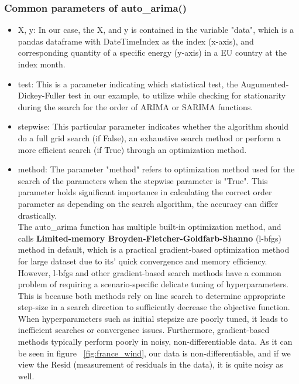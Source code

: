 \documentclass[]{usiinfbachelorproject}
\begin{document}
\subsubsection{Common parameters of auto\_arima()}
\begin{itemize}
\item X, y: In our case, the X, and y is contained in the variable "data", which is a pandas dataframe with DateTimeIndex as the index (x-axis), and corresponding quantity of a specific energy (y-axis) in a EU country at the index month. \\

\item test: This is a parameter indicating which statistical test, the Augumented-Dickey-Fuller test in our example, to utilize while checking for stationarity during the search for the order of ARIMA or SARIMA functions. \\

\item stepwise: This particular parameter indicates whether the algorithm should do a full grid search (if False), an exhaustive search method or perform a more efficient search (if True) through an optimization method. \\

\item method: The parameter "method" refers to optimization method used for the search of the parameters when the stepwise parameter is "True". This parameter holds significant importance in calculating the correct order parameter as depending on the search algorithm, the accuracy can differ drastically.\\

The auto\_arima function has multiple built-in optimization method, and calls \textbf{Limited-memory Broyden-Fletcher-Goldfarb-Shanno} (l-bfgs) method in default, which is a practical gradient-based optimization method for large dataset due to its' quick convergence and memory efficiency. However, l-bfgs and other gradient-based search methods have a common problem of requiring a scenario-specific delicate tuning of hyperparameters. This is because both methods rely on line search to determine appropriate step-size in a search direction to sufficiently decrease the objective function. When hyperparameters such as initial stepsize are poorly tuned, it leads to inefficient searches or convergence issues. Furthermore, gradient-based methods typically perform poorly in noisy, non-differentiable data. As it can be seen in figure ~\ref{fig:france_wind}, our data is non-differentiable, and if we view the Resid (measurement of residuals in the data), it is quite noisy as well. \\


\end{itemize}
\end{document}
